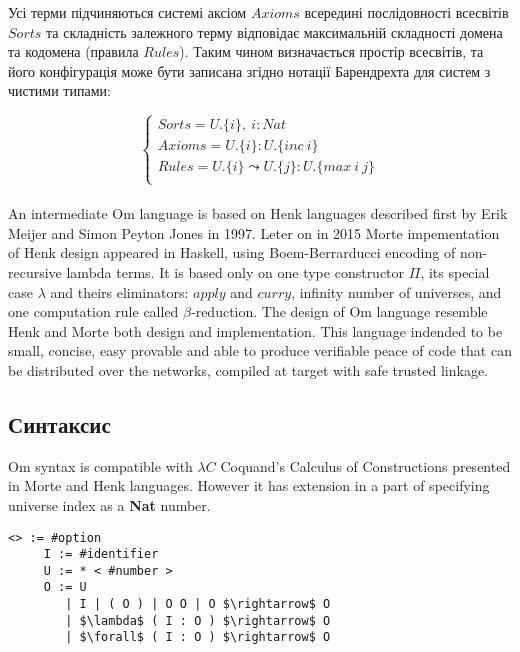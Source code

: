 Усі терми підчиняються системі аксіом $Axioms$ всередині послідовності всесвітів $Sorts$
та складність залежного терму відповідає максимальній складності домена та кодомена (правила $Rules$).
Таким чином визначається простір всесвітів, та його конфігурація може бути записана
згідно нотації Барендрехта для систем з чистими типами:

$$
\begin{cases}
    Sorts = U.\{i\},\ i : Nat\\
    Axioms = U.\{i\} : U.\{inc\ i\}\\
    Rules = U.\{i\} \leadsto U.\{j\} : U.\{max\ i\ j\}\\
\end{cases}
$$

\paragraph{}
An intermediate Om language is based on Henk\cite{henk} languages described first
by Erik Meijer and Simon Peyton Jones in 1997. Leter on in 2015 Morte impementation
of Henk design appeared in Haskell, using Boem-Berrarducci encoding of non-recursive lambda terms.
It is based only on one type constructor $\Pi$, its special case $\lambda$ and theirs eliminators:
$apply$ and $curry$, infinity number of universes,
and one computation rule called $\beta$-reduction.
The design of Om language resemble Henk and Morte both
design and implementation. This language indended to be small, concise, easy provable
and able to produce verifiable peace of code that can be distributed over the networks,
compiled at target with safe trusted linkage.

\newpage
\subsection{Синтаксис}
Om syntax is compatible with $\lambda C$ Coquand's Calculus of Constructions presented
in Morte and Henk languages. However it has extension in a part of specifying
universe index as a {\bf Nat} number.

\vspace{0.5cm}
\begin{lstlisting}[mathescape=true]
    <> := #option
     I := #identifier
     U := * < #number >
     O := U
        | I | ( O ) | O O | O $\rightarrow$ O
        | $\lambda$ ( I : O ) $\rightarrow$ O
        | $\forall$ ( I : O ) $\rightarrow$ O
\end{lstlisting}

